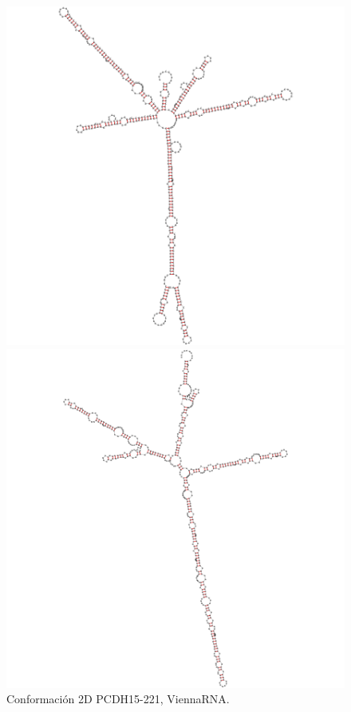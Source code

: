 \documentclass[a4paper,11pt,titlepage]{article}
\theoremstyle{definition}
\begin{document}
\begin{figure}[H]
    \centering
    \begin{minipage}[c]{0.23\textwidth}
        \centering
        \includegraphics[width=\textwidth]{images/PCDH15-221-db_vrna.png}
        \caption{Conformación 2D PCDH15-221, ViennaRNA.}
        \label{fig:PCDH15-221-vrna}
    \end{minipage}
    \hfill
    \begin{minipage}[c]{0.23\textwidth}
        \centering
        \includegraphics[width=\textwidth]{images/PCDH15-221-db_sqf.png}

\end{minipage}
\end{figure}
\end{document}
